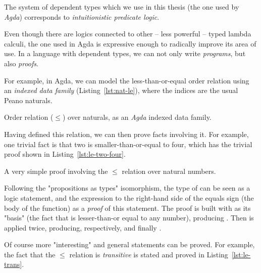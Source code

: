            The system of dependent types which we use in this thesis (the one used by \emph{Agda})
            corresponds to \emph{intuitionistic predicate logic}.

            Even though there are logics connected to other – less powerful – typed lambda calculi,
            the one used in Agda is expressive enough to radically improve its area of use.
            In a language with dependent types, we can not only write \emph{programs}, but also \emph{proofs}.

            For example, in Agda, we can model the less-than-or-equal order relation using an
            \emph{indexed data family} (Listing~\ref{lst:nat-le}),
            where the indices are the usual Peano naturals.

            \begin{listing}[h]
                \caption{Order relation ($\le$) over naturals, as an \emph{Agda} indexed data family.
                    \label{lst:nat-le}}
            \end{listing}

            Having defined this relation, we can then prove facts involving it.
            For example, one trivial fact is that two is smaller-than-or-equal to four,
            which has the trivial proof shown in Listing~\ref{lst:le-two-four}.

            \begin{listing}[h]
                \caption{A very simple proof involving the $\le$ relation over natural numbers.
                    \label{lst:le-two-four}}
            \end{listing}

            Following the "propositions as types" isomorphism, the type of 
            can be seen as a logic statement, and the expression to the right-hand side of the equals sign
            (the body of the function) as a \emph{proof} of this statement.
            The proof is built with  as its "basis" (the fact that  is
            lesser-than-or equal to any number), producing   .
            Then  is applied twice, producing, respectively,   
            and finally   .

            Of course more "interesting" and general statements can be proved.
            For example, the fact that the $\le$ relation is \emph{transitive} is
            stated and proved in Listing~\ref{lst:le-trans}.

